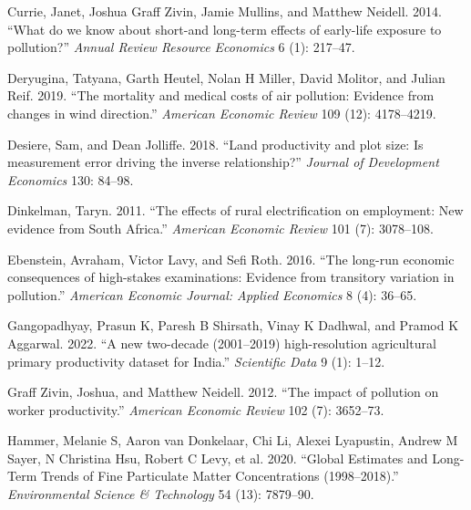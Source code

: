 \documentclass[
]{article}
\newlength{\cslhangindent}
\newlength{\cslentryspacingunit} %
\newenvironment{CSLReferences}[2] %
 {%
  \setlength{\parindent}{0pt}
  \ifodd #1
  \let\oldpar\par
  \def\par{\hangindent=\cslhangindent\oldpar}
  \fi
  \setlength{\parskip}{#2\cslentryspacingunit}
 }%
 {}
\begin{document}
\begin{CSLReferences}{1}{0}
\leavevmode{}%
Currie, Janet, Joshua Graff Zivin, Jamie Mullins, and Matthew Neidell. 2014. {``{What do we know about short-and long-term effects of early-life exposure to pollution?}''} \emph{{Annual Review Resource Economics}} 6 (1): 217--47.

\leavevmode{}%
Deryugina, Tatyana, Garth Heutel, Nolan H Miller, David Molitor, and Julian Reif. 2019. {``{The mortality and medical costs of air pollution: Evidence from changes in wind direction}.''} \emph{{American Economic Review}} 109 (12): 4178--4219.

\leavevmode{}%
Desiere, Sam, and Dean Jolliffe. 2018. {``{Land productivity and plot size: Is measurement error driving the inverse relationship?}''} \emph{{Journal of Development Economics}} 130: 84--98.

\leavevmode{}%
Dinkelman, Taryn. 2011. {``{The effects of rural electrification on employment: New evidence from South Africa}.''} \emph{{American Economic Review}} 101 (7): 3078--108.

\leavevmode{}%
Ebenstein, Avraham, Victor Lavy, and Sefi Roth. 2016. {``{The long-run economic consequences of high-stakes examinations: Evidence from transitory variation in pollution}.''} \emph{{American Economic Journal: Applied Economics}} 8 (4): 36--65.

\leavevmode{}%
Gangopadhyay, Prasun K, Paresh B Shirsath, Vinay K Dadhwal, and Pramod K Aggarwal. 2022. {``{A new two-decade (2001--2019) high-resolution agricultural primary productivity dataset for India}.''} \emph{{Scientific Data}} 9 (1): 1--12.

\leavevmode{}%
Graff Zivin, Joshua, and Matthew Neidell. 2012. {``{The impact of pollution on worker productivity}.''} \emph{{American Economic Review}} 102 (7): 3652--73.

\leavevmode{}%
Hammer, Melanie S, Aaron van Donkelaar, Chi Li, Alexei Lyapustin, Andrew M Sayer, N Christina Hsu, Robert C Levy, et al. 2020. {``Global Estimates and Long-Term Trends of Fine Particulate Matter Concentrations (1998--2018).''} \emph{{Environmental Science \& Technology}} 54 (13): 7879--90.


\end{CSLReferences}
\end{document}
